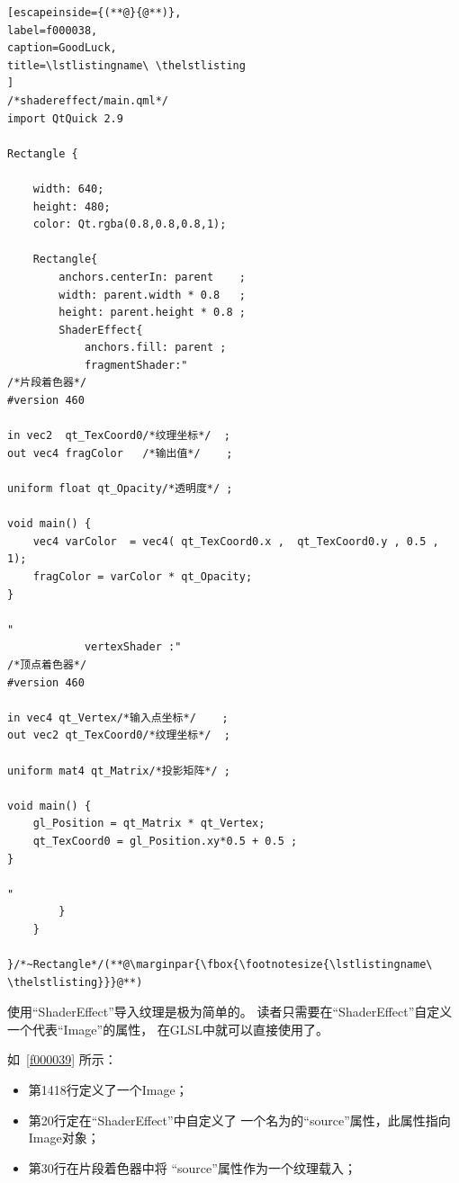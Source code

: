 \FloatBarrier
\begin{lstlisting}[escapeinside={(**@}{@**)},
label=f000038,
caption=GoodLuck,
title=\lstlistingname\ \thelstlisting
]
/*shadereffect/main.qml*/
import QtQuick 2.9

Rectangle {

    width: 640;
    height: 480;
    color: Qt.rgba(0.8,0.8,0.8,1);

    Rectangle{
        anchors.centerIn: parent    ;
        width: parent.width * 0.8   ;
        height: parent.height * 0.8 ;
        ShaderEffect{
            anchors.fill: parent ;
            fragmentShader:"
/*片段着色器*/
#version 460

in vec2  qt_TexCoord0/*纹理坐标*/  ;
out vec4 fragColor   /*输出值*/    ;

uniform float qt_Opacity/*透明度*/ ;

void main() {
    vec4 varColor  = vec4( qt_TexCoord0.x ,  qt_TexCoord0.y , 0.5 , 1);
    fragColor = varColor * qt_Opacity;
}

"
            vertexShader :"
/*顶点着色器*/
#version 460

in vec4 qt_Vertex/*输入点坐标*/    ;
out vec2 qt_TexCoord0/*纹理坐标*/  ;

uniform mat4 qt_Matrix/*投影矩阵*/ ;

void main() {
    gl_Position = qt_Matrix * qt_Vertex;
    qt_TexCoord0 = gl_Position.xy*0.5 + 0.5 ;
}

"
        }
    }

}/*~Rectangle*/(**@\marginpar{\fbox{\footnotesize{\lstlistingname\ \thelstlisting}}}@**)\end{lstlisting}          %


使用“ShaderEffect”导入纹理是极为简单的。
读者只需要在“ShaderEffect”自定义
一个代表“Image”的属性，
在GLSL中就可以直接使用了。

如\lstlistingname\ \ref{f000039}
所示：

\begin{itemize}

\item 第14\raisebox{0.16ex}{\sourcefonttwo\~{}}18行定义了一个Image；
\item 第20行定在“ShaderEffect”中自定义了
一个名为的“source”属性，此属性指向Image对象；
\item 第30行在片段着色器中将
“source”属性作为一个纹理载入；

\end{itemize}

